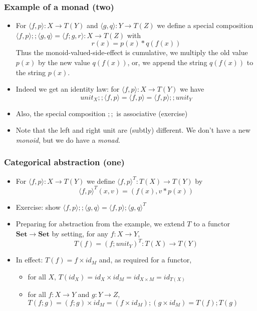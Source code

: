 \documentclass[handout]{beamer}
\newcommand{\bfsf}[1]{{\boldsymbol{#1}}}
\newcommand{\Set}{\bfsf{Set}}
\newcommand{\Kp}[1]{{\langle #1 \rangle}}
\newcommand{\Kc}{;\!;}
\begin{document}
\frame
  {   
    \frametitle{Example of a monad (two)}\label{Mon5:ExaSetMtwo}

 \begin{itemize}[<+->]
\item For $\Kp{f,p}: X\to T(Y)$ and $\Kp{g,q}: Y\to T(Z)$ we define a special
composition $\Kp{f,p}\Kc \Kp{g,q} = \Kp{f;g,r} : X\to T(Z)$ with $$r(x)=p(x)*q(f(x))$$
Thus the monoid-valued-side-effect is cumulative,
we multiply the old value $p(x)$ by the new value $q(f(x))$,
or, we append the string $q(f(x))$ to the string $p(x)$.
\item Indeed we get an identity law: for $\Kp{f,p}: X\to T(Y)$ we have
$$unit_X\Kc \Kp{f,p}  = \Kp{f,p} = \Kp{f,p}\Kc unit_Y$$
\item Also, the special composition $\Kc$ is associative  (exercise)
\item Note that the left and right unit are (subtly) different.
We don't have a new \emph{monoid}, but we do have a \emph{monad}.
 \end{itemize}

 }

\frame
  {   
    \frametitle{Categorical abstraction (one)}\label{Mon5:CatAbstrOne}

 \begin{itemize}[<+->]
\item For $\Kp{f,p} : X\to T(Y)$ we define $\Kp{f,p}^T : T(X)\to T(Y)$ by
$$\Kp{f,p}^T(x,v) = (f(x),v*p(x))$$
\item Exercise: show $\Kp{f,p}\Kc\Kp{g,q} = \Kp{f,p};\Kp{g,q}^T$
\item Preparing for abstraction from the example,
we extend $T$ to a functor $\Set\to\Set$ 
by setting, for any $f:X\to Y$,  $$T(f) = (f; unit_Y)^T : T(X)\to T(Y)$$
\item In effect: $T(f) = f\times id_M$ and, as required for a functor,
\begin{itemize}
\item for all $X$,
$T(id_X) = id_X \times id_M = id_{X\times M} = id_{T(X)}$
\item for all $f:X\to Y$ and $g:Y\to Z$, $T(f;g) = (f;g)\times id_M =
(f\times id_M);(g\times id_M) = T(f); T(g)$
\end{itemize}
 \end{itemize}

 }
\end{document}
